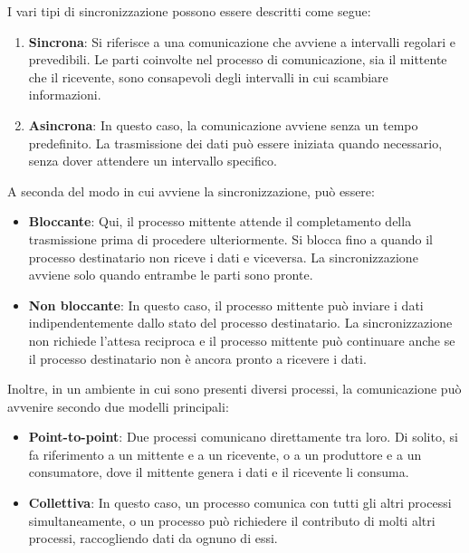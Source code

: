 I vari tipi di sincronizzazione possono essere descritti come segue:

\begin{enumerate}
	\item \textbf{Sincrona}: Si riferisce a una comunicazione che avviene a intervalli regolari e prevedibili. Le parti coinvolte nel processo di comunicazione, sia il mittente che il ricevente, sono consapevoli degli intervalli in cui scambiare informazioni.
	
	\item \textbf{Asincrona}: In questo caso, la comunicazione avviene senza un tempo predefinito. La trasmissione dei dati può essere iniziata quando necessario, senza dover attendere un intervallo specifico.
\end{enumerate}

A seconda del modo in cui avviene la sincronizzazione, può essere:

\begin{itemize}
	\item \textbf{Bloccante}: Qui, il processo mittente attende il completamento della trasmissione prima di procedere ulteriormente. Si blocca fino a quando il processo destinatario non riceve i dati e viceversa. La sincronizzazione avviene solo quando entrambe le parti sono pronte.
	
	\item \textbf{Non bloccante}: In questo caso, il processo mittente può inviare i dati indipendentemente dallo stato del processo destinatario. La sincronizzazione non richiede l'attesa reciproca e il processo mittente può continuare anche se il processo destinatario non è ancora pronto a ricevere i dati.
\end{itemize}

Inoltre, in un ambiente in cui sono presenti diversi processi, la comunicazione può avvenire secondo due modelli principali:

\begin{itemize}
	\item \textbf{Point-to-point}: Due processi comunicano direttamente tra loro. Di solito, si fa riferimento a un mittente e a un ricevente, o a un produttore e a un consumatore, dove il mittente genera i dati e il ricevente li consuma.
	
	\item \textbf{Collettiva}: In questo caso, un processo comunica con tutti gli altri processi simultaneamente, o un processo può richiedere il contributo di molti altri processi, raccogliendo dati da ognuno di essi.
\end{itemize}
